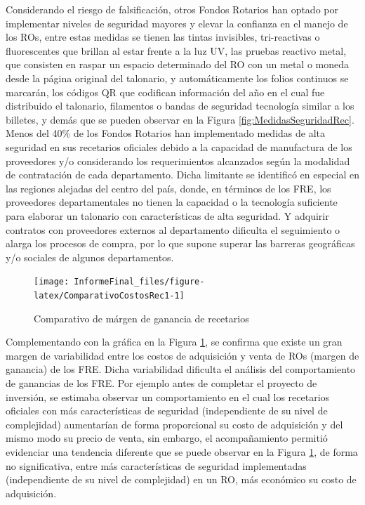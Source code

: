 \documentclass[
]{book}
\begin{document}
Considerando el riesgo de falsificación, otros Fondos Rotarios han optado por implementar niveles de seguridad mayores y elevar la confianza en el manejo de los ROs, entre estas medidas se tienen las tintas invisibles, tri-reactivas o fluorescentes que brillan al estar frente a la luz UV, las pruebas reactivo metal, que consisten en raspar un espacio determinado del RO con un metal o moneda desde la página original del talonario, y automáticamente los folios continuos se marcarán, los códigos QR que codifican información del año en el cual fue distribuido el talonario, filamentos o bandas de seguridad tecnología similar a los billetes, y demás que se pueden observar en la Figura \ref{fig:MedidasSeguridadRec}. Menos del 40\% de los Fondos Rotarios han implementado medidas de alta seguridad en sus recetarios oficiales debido a la capacidad de manufactura de los proveedores y/o considerando los requerimientos alcanzados según la modalidad de contratación de cada departamento. Dicha limitante se identificó en especial en las regiones alejadas del centro del país, donde, en términos de los FRE, los proveedores departamentales no tienen la capacidad o la tecnología suficiente para elaborar un talonario con características de alta seguridad. Y adquirir contratos con proveedores externos al departamento dificulta el seguimiento o alarga los procesos de compra, por lo que supone superar las barreras geográficas y/o sociales de algunos departamentos.

\begin{figure}
\texttt{[image: InformeFinal\_files/figure-latex/ComparativoCostosRec1-1]} \caption{Comparativo de márgen de ganancia de recetarios}\label{fig:ComparativoCostosRec1}
\end{figure}

Complementando con la gráfica en la Figura \ref{fig:ComparativoCostosRec1}, se confirma que existe un gran margen de variabilidad entre los costos de adquisición y venta de ROs (margen de ganancia) de los FRE. Dicha variabilidad dificulta el análisis del comportamiento de ganancias de los FRE. Por ejemplo antes de completar el proyecto de inversión, se estimaba observar un comportamiento en el cual los recetarios oficiales con más características de seguridad (independiente de su nivel de complejidad) aumentarían de forma proporcional su costo de adquisición y del mismo modo su precio de venta, sin embargo, el acompañamiento permitió evidenciar una tendencia diferente que se puede observar en la Figura \ref{fig:ComparativoCostosRec1}, de forma no significativa, entre más características de seguridad implementadas (independiente de su nivel de complejidad) en un RO, más económico su costo de adquisición.
\end{document}
